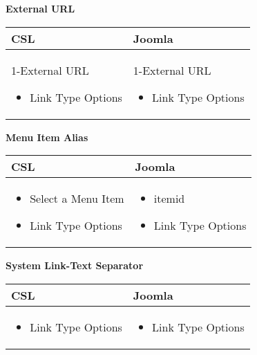 \textbf{External URL}

\begin{minipage}{0.7\textwidth}
\begin{tabular}{|p{} | p{}|}
\hline
\textbf{CSL} & \textbf{Joomla} \\ 
\hline
1-External URL
 \begin{itemize}
 \item Link Type Options
 \end{itemize}
 & 
1-External URL
\begin{itemize}
 \item Link Type Options
 \end{itemize}
\\
\hline
\end{tabular}
\end{minipage}

\textbf{Menu Item Alias}

\begin{minipage}{0.7\textwidth}
\begin{tabular}{|p{} | p{}|}
\hline
\textbf{CSL} & \textbf{Joomla} \\ 
\hline

 \begin{itemize}
 \item Select a Menu Item
 \item Link Type Options
 \end{itemize}
 & 

\begin{itemize}
\item itemid
 \item Link Type Options
 \end{itemize}
\\
\hline
\end{tabular}
\end{minipage}

\textbf{System Link-Text Separator}

\begin{minipage}{0.7\textwidth}
\begin{tabular}{|p{} | p{}|}
\hline
\textbf{CSL} & \textbf{Joomla} \\ 
\hline

 \begin{itemize}
 \item Link Type Options
 \end{itemize}
 & 

\begin{itemize}
 \item Link Type Options
 \end{itemize}
\\
\hline
\end{tabular}
\end{minipage}


